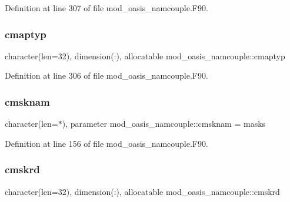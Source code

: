 Definition at line 307 of file mod\+\_\+oasis\+\_\+namcouple.\+F90.

\mbox{\label{namespacemod__oasis__namcouple_a3aaa6f326df10eb6e4417ad72e436b41}} 
\subsubsection{\texorpdfstring{cmaptyp}{cmaptyp}}
{\footnotesize\ttfamily character(len=32), dimension(\+:), allocatable mod\+\_\+oasis\+\_\+namcouple\+::cmaptyp\hspace{0.3cm}{\ttfamily [private]}}



Definition at line 306 of file mod\+\_\+oasis\+\_\+namcouple.\+F90.

\mbox{\label{namespacemod__oasis__namcouple_a29b8cbc6b088d00d249b654bd27b9a1f}} 
\subsubsection{\texorpdfstring{cmsknam}{cmsknam}}
{\footnotesize\ttfamily character(len=$\ast$), parameter mod\+\_\+oasis\+\_\+namcouple\+::cmsknam = \textquotesingle{}masks\textquotesingle{}\hspace{0.3cm}{\ttfamily [private]}}



Definition at line 156 of file mod\+\_\+oasis\+\_\+namcouple.\+F90.

\mbox{\label{namespacemod__oasis__namcouple_a8872c4a8cdff16451ef7d8af02e39358}} 
\subsubsection{\texorpdfstring{cmskrd}{cmskrd}}
{\footnotesize\ttfamily character(len=32), dimension(\+:), allocatable mod\+\_\+oasis\+\_\+namcouple\+::cmskrd\hspace{0.3cm}{\ttfamily [private]}}



